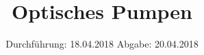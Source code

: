 

\subject{V21}
\title{Optisches Pumpen}
\date{
\centering
  Durchführung: 18.04.2018
  \hspace{3em}
  Abgabe: 20.04.2018
}



\maketitle
\thispagestyle{empty}
\tableofcontents
\newpage

%






\printbibliography


